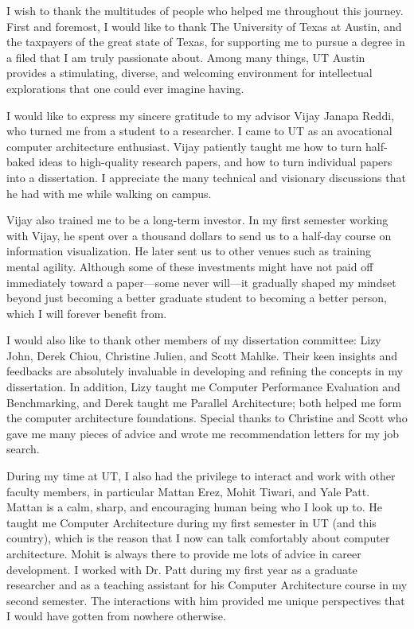 
\begin{acknowledgments}		%
I wish to thank the multitudes of people who helped me throughout this journey. First and foremost, I would like to thank The University of Texas at Austin, and the taxpayers of the great state of Texas, for supporting me to pursue a degree in a filed that I am truly passionate about. Among many things, UT Austin provides a stimulating, diverse, and welcoming environment for intellectual explorations that one could ever imagine having.

I would like to express my sincere gratitude to my advisor Vijay Janapa Reddi, who turned me from a student to a researcher. I came to UT as an avocational computer architecture enthusiast. Vijay patiently taught me how to turn half-baked ideas to high-quality research papers, and how to turn individual papers into a dissertation. I appreciate the many technical and visionary discussions that he had with me while walking on campus.

Vijay also trained me to be a long-term investor. In my first semester working with Vijay, he spent over a thousand dollars to send us to a half-day course on information visualization. He later sent us to other venues such as training mental agility. Although some of these investments might have not paid off immediately toward a paper---some never will---it gradually shaped my mindset beyond just becoming a better graduate student to becoming a better person, which I will forever benefit from.

I would also like to thank other members of my dissertation committee: Lizy John, Derek Chiou, Christine Julien, and Scott Mahlke. Their keen insights and feedbacks are absolutely invaluable in developing and refining the concepts in my dissertation. In addition, Lizy taught me Computer Performance Evaluation and Benchmarking, and Derek taught me Parallel Architecture; both helped me form the computer architecture foundations. Special thanks to Christine and Scott who gave me many pieces of advice and wrote me recommendation letters for my job search.

During my time at UT, I also had the privilege to interact and work with other faculty members, in particular Mattan Erez, Mohit Tiwari, and Yale Patt. Mattan is a calm, sharp, and encouraging human being who I look up to. He taught me Computer Architecture during my first semester in UT (and this country), which is the reason that I now can talk comfortably about computer architecture. Mohit is always there to provide me lots of advice in career development. I worked with Dr. Patt during my first year as a graduate researcher and as a teaching assistant for his Computer Architecture course in my second semester. The interactions with him provided me unique perspectives that I would have gotten from nowhere otherwise.


\end{acknowledgments}
